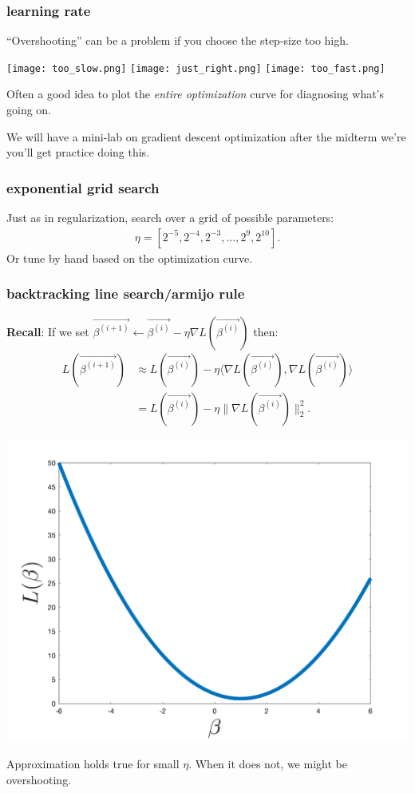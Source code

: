 \documentclass[handout,compress]{beamer}
\begin{document}
\begin{frame}
	\frametitle{learning rate}
	``Overshooting'' can be a problem if you choose the step-size too high. 
	\begin{center}
		\texttt{[image: too\_slow.png]} 	\texttt{[image: just\_right.png]} 	\texttt{[image: too\_fast.png]}
	\end{center}
	Often a good idea to plot the \emph{entire optimization} curve for diagnosing what's going on.
	
	We will have a mini-lab on gradient descent optimization after the midterm we're you'll get practice doing this.
\end{frame}

\begin{frame}
	\frametitle{exponential grid search}
	Just as in regularization, search over a grid of possible parameters:
	\begin{align*}
	\eta = [2^{-5}, 2^{-4}, 2^{-3}, \ldots, 2^9,2^{10}].
	\end{align*}
	Or tune by hand based on the optimization curve.
\end{frame}

\begin{frame}
	\frametitle{backtracking  line search/armijo rule}
	\textbf{Recall}: If we set $\vec{\beta^{(i+1)}}\leftarrow \vec{\beta^{(i)}} - \eta \nabla L(\vec{\beta^{(i)}})$ then:
	\begin{align*}
		L(\vec{\beta^{(i+1)}}) &\approx L(\vec{\beta^{(i)}}) - \eta \langle \nabla L(\vec{\beta^{(i)}}), \nabla L(\vec{\beta^{(i)}})\rangle\\
		 &= L(\vec{\beta^{(i)}}) - \eta  \|\nabla L(\vec{\beta^{(i)}})\|_2^2.
	\end{align*}
	\begin{center}
		\includegraphics[width=.4\textwidth]{1d_example.png}
		
		Approximation holds true for small $\eta$. When it does not, we might be overshooting.
	\end{center}
\end{frame}
\end{document}
